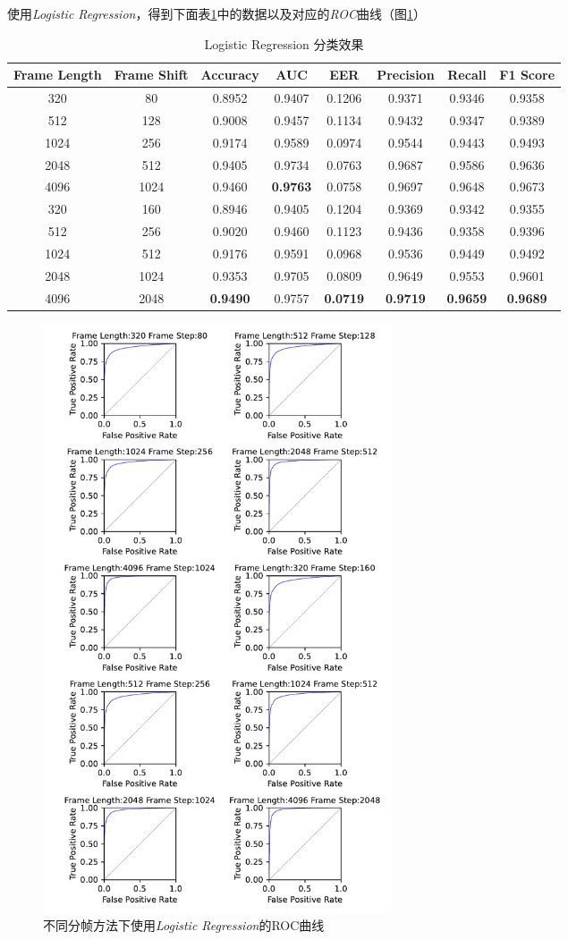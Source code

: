 \documentclass[a4paper]{article}
\begin{document}
使用\emph{Logistic Regression}，得到下面表\ref{tab:Logistic Regression}中的数据以及对应的\emph{ROC}曲线（图\ref{fig:ROC Logistic Regression}）
\begin{table}[ht]
  \caption{Logistic Regression 分类效果}
  \label{tab:Logistic Regression}
  \centering
  \begin{tabular}{c|c|c|c|c|c|c|c}
    \toprule
    \textbf{Frame Length} & \textbf{Frame Shift} & \textbf{Accuracy} & \textbf{AUC} & \textbf{EER} & \textbf{Precision} & \textbf{Recall} & \textbf{F1 Score}\\
    \midrule
    320 & 80 & 0.8952 & 0.9407 & 0.1206 & 0.9371 & 0.9346 & 0.9358 \\
    512 & 128 & 0.9008 & 0.9457 & 0.1134 & 0.9432 & 0.9347 & 0.9389 \\
    1024 & 256 & 0.9174 & 0.9589 & 0.0974 & 0.9544 & 0.9443 & 0.9493 \\
    2048 & 512 & 0.9405 & 0.9734 & 0.0763 & 0.9687 & 0.9586 & 0.9636 \\
    4096 & 1024 & 0.9460 & \textbf{0.9763} & 0.0758 & 0.9697 & 0.9648 & 0.9673 \\
    320 & 160 & 0.8946 & 0.9405 & 0.1204 & 0.9369 & 0.9342 & 0.9355 \\
    512 & 256 & 0.9020 & 0.9460 & 0.1123 & 0.9436 & 0.9358 & 0.9396 \\
    1024 & 512 & 0.9176 & 0.9591 & 0.0968 & 0.9536 & 0.9449 & 0.9492 \\
    2048 & 1024 & 0.9353 & 0.9705 & 0.0809 & 0.9649 & 0.9553 & 0.9601 \\
    4096 & 2048 & \textbf{0.9490} & 0.9757 & \textbf{0.0719} & \textbf{0.9719} & \textbf{0.9659} & \textbf{0.9689} \\
    \bottomrule
  \end{tabular}
\end{table}

\begin{figure}[ht]
  \centering
  \includegraphics[width=0.5\textwidth]{figs/ROC_Logistic_Regression.pdf}
  \caption{不同分帧方法下使用\emph{Logistic Regression}的ROC曲线}
  \label{fig:ROC Logistic Regression}
\end{figure}
\end{document}
